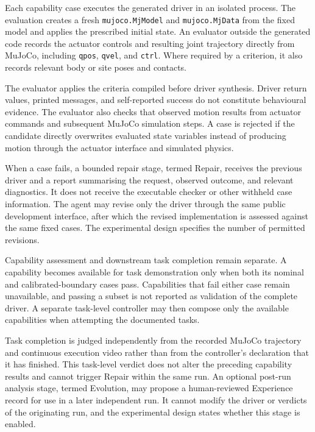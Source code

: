 Each capability case executes the generated driver in an isolated process. The
evaluation creates a fresh \texttt{mujoco.MjModel} and
\texttt{mujoco.MjData} from the fixed model and applies the prescribed initial
state. An evaluator outside the generated code records the actuator controls
and resulting joint trajectory directly from MuJoCo, including
\texttt{qpos}, \texttt{qvel}, and \texttt{ctrl}. Where required by a
criterion, it also records relevant body or site poses and contacts.

The evaluator applies the criteria compiled before driver synthesis. Driver
return values, printed messages, and self-reported success do not constitute
behavioural evidence. The evaluator also checks that observed motion results
from actuator commands and subsequent MuJoCo simulation steps. A case is
rejected if the candidate directly overwrites evaluated state variables instead
of producing motion through the actuator interface and simulated physics.

When a case fails, a bounded repair stage, termed Repair, receives the previous
driver and a report summarising the request, observed outcome, and relevant
diagnostics. It does not receive the executable checker or other withheld case
information. The agent may revise only the driver through the same public
development interface, after which the revised implementation is assessed
against the same fixed cases. The experimental design specifies the number of
permitted revisions.

Capability assessment and downstream task completion remain separate. A
capability becomes available for task demonstration only when both its nominal
and calibrated-boundary cases pass. Capabilities that fail either case remain
unavailable, and passing a subset is not reported as validation of the complete
driver. A separate task-level controller may then compose only the available
capabilities when attempting the documented tasks.

Task completion is judged independently from the recorded MuJoCo trajectory
and continuous execution video rather than from the controller's declaration
that it has finished. This task-level verdict does not alter the preceding
capability results and cannot trigger Repair within the same run. An optional
post-run analysis stage, termed Evolution, may propose a human-reviewed
Experience record for use in a later independent run. It cannot modify the
driver or verdicts of the originating run, and the experimental design states
whether this stage is enabled.

